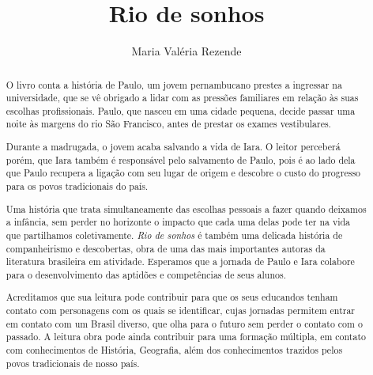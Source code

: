 \documentclass[12pt]{extarticle}
\begin{document}
\newcommand{\AutorLivro}{Maria Valéria Rezende}
\newcommand{\TituloLivro}{Rio de sonhos}
\newcommand{\Tema}{Ficção, mistério e fantasia}
\newcommand{\Genero}{Conto, crônica e novela}
\newcommand{\imagemCapa}{./images/PNLD0051-01.png}
\newcommand{\issnppub}{978-65-88791-05-9}
\newcommand{\issnepub}{978-65-88791-06-6}
\newcommand{\colaborador}{{Raphaella Lira}}

\title{\TituloLivro}
\author{\AutorLivro}
\def\authornotes{\colaborador}

\date{}
\maketitle


\begin{abstract}

O livro conta a história de Paulo, um jovem pernambucano prestes a ingressar na universidade, 
que se vê obrigado a lidar 
com as pressões familiares em relação às suas escolhas profissionais.
Paulo, que nasceu em uma cidade pequena, decide passar uma noite às margens do rio São Francisco,
antes de prestar os exames vestibulares.

Durante a madrugada, o jovem acaba salvando a vida de Iara. 
O leitor perceberá porém, que Iara também é responsável pelo 
salvamento de Paulo, pois é ao
lado dela que Paulo recupera a ligação com seu lugar de origem
e descobre o custo do progresso para os povos tradicionais do
país.

Uma história que trata simultaneamente das escolhas pessoais 
a fazer quando deixamos a infância, sem perder no horizonte
o impacto que cada uma delas pode ter na vida que partilhamos
coletivamente. \emph{Rio de sonhos} é também uma delicada história de
companheirismo e descobertas, obra de uma das mais importantes autoras
da literatura brasileira em atividade. Esperamos que a jornada de Paulo
e Iara colabore para o desenvolvimento das aptidões e competências de
seus alunos.

Acreditamos que sua leitura pode
contribuir para que os seus educandos tenham contato com personagens com os
quais se identificar, cujas jornadas permitem entrar em
contato com um Brasil diverso, que olha para o futuro sem perder o
contato com o passado. A leitura obra pode ainda 
contribuir para uma formação múltipla, em contato com conhecimentos de
História, Geografia, além dos conhecimentos trazidos pelos povos
tradicionais de nosso país.

\end{abstract}
\end{document}
